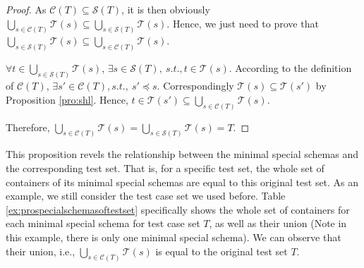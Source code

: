 \begin{proof}
As $\mathcal{C}(T) \subseteq \mathcal{S}(T)$,  it is then obviously $\bigcup_{s \in \mathcal{C}(T)} \mathcal{T}(s) \subseteq \bigcup_{s \in \mathcal{S}(T)} \mathcal{T}(s)$. Hence, we just need to prove that $\bigcup_{s \in \mathcal{S}(T)} \mathcal{T}(s) \subseteq \bigcup_{s \in \mathcal{C}(T)} \mathcal{T}(s)$.

$\forall t \in \bigcup_{s \in \mathcal{S}(T)} \mathcal{T}(s) $, $\exists s \in \mathcal{S}(T),\ s.t., t \in \mathcal{T}(s)$. According to the definition of $\mathcal{C}(T)$, $\exists s' \in \mathcal{C}(T), s.t.,\ s' \preceq s$. Correspondingly $\mathcal{T}(s) \subseteq \mathcal{T}(s')$ by Proposition \ref{pro:shl}. Hence, $t \in \mathcal{T}(s') \subseteq \bigcup_{s \in \mathcal{C}(T)} \mathcal{T}(s)$.

Therefore, $\bigcup_{s \in \mathcal{C}(T)} \mathcal{T}(s) = \bigcup_{s \in \mathcal{S}(T)} \mathcal{T}(s) = T$.
\end{proof}


This proposition revels the relationship between the minimal special schemas and the corresponding test set. That is, for a specific test set, the whole set of containers of its minimal special schemas are equal to this original test set. As an example, we still consider the test case set we used before. Table \ref{ex:prospecialschemasoftestset} specifically shows the whole set of containers for each minimal special schema for test case set $T$, as well as their union (Note in this example, there is only one minimal special schema). We can observe that their union, i.e.,  $\bigcup_{s \in \mathcal{C}(T)}\mathcal{T}(s)$ is equal to the original test set $T$.

